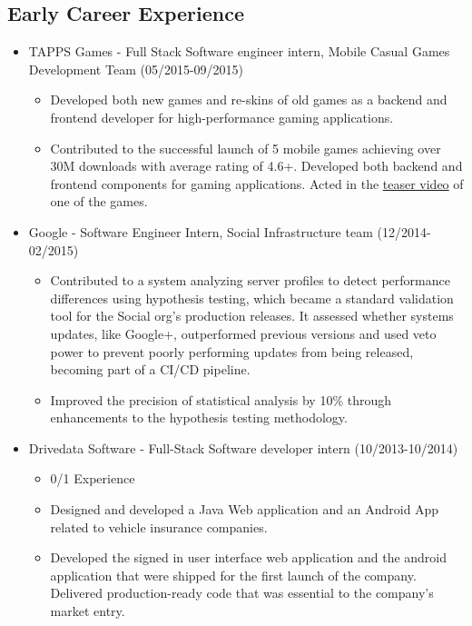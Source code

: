 
\subsection{Early Career Experience}
\begin{itemize}
    \item \footnotesize{TAPPS Games - Full Stack Software engineer intern, Mobile Casual Games 
        Development Team (05/2015-09/2015)}
    \begin{itemize}
        \item \scriptsize{Developed both new games and re-skins of old games as a backend and frontend
        developer for high-performance gaming applications.}
        \item \scriptsize{Contributed to the successful launch of 5 mobile games achieving over 30M
        downloads with average rating of 4.6+. Developed both backend and frontend components for
        gaming applications. Acted in the
        \href{https://www.youtube.com/watch?v=ttjWkk9w-8Q}{teaser video} of one of the games.}
    \end{itemize}
    
    \item \footnotesize{Google - Software Engineer Intern, Social Infrastructure team (12/2014-02/2015)}
    \begin{itemize}
        \item \scriptsize{Contributed to a system analyzing server profiles to detect performance 
            differences using hypothesis testing, which became a standard validation tool for the Social 
            org's production releases. It assessed whether systems updates, like Google+, outperformed
            previous versions and used veto power to prevent poorly performing updates from being 
            released, becoming part of a CI/CD pipeline.}
        \item \scriptsize{Improved the precision of statistical analysis by 10\% through enhancements to 
            the hypothesis testing methodology.}
    \end{itemize}

    \item \footnotesize{Drivedata Software - Full-Stack Software developer intern (10/2013-10/2014)}
    \begin{itemize}
        \item \scriptsize{0/1 Experience}
        \item \scriptsize{Designed and developed a Java Web application and an Android App related to vehicle insurance companies.}
        \item \scriptsize{Developed the signed in user interface web application and the android application that were shipped for the first launch of the company. Delivered production-ready code that was essential to the company's market entry.}
    \end{itemize}


\end{itemize}
